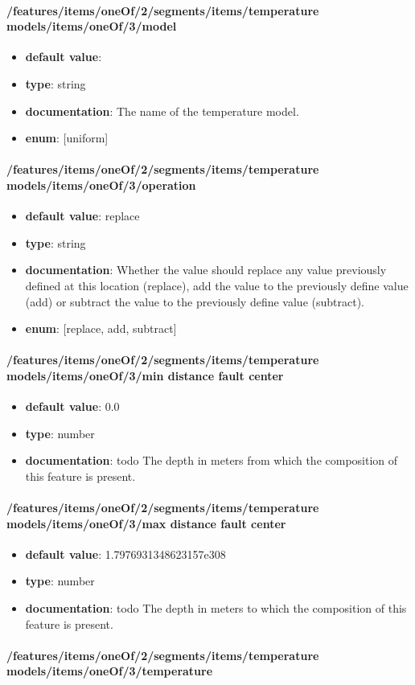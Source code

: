 \paragraph{/features/items/oneOf/2/segments/items/temperature models/items/oneOf/3/model}
\begin{itemize}\item {\bf default value}: 
\item {\bf type}: string
\item {\bf documentation}: The name of the temperature model.
\item {\bf enum}: [uniform]\end{itemize}\paragraph{/features/items/oneOf/2/segments/items/temperature models/items/oneOf/3/operation}
\begin{itemize}\item {\bf default value}: replace
\item {\bf type}: string
\item {\bf documentation}: Whether the value should replace any value previously defined at this location (replace), add the value to the previously define value (add) or subtract the value to the previously define value (subtract).
\item {\bf enum}: [replace, add, subtract]\end{itemize}\paragraph{/features/items/oneOf/2/segments/items/temperature models/items/oneOf/3/min distance fault center}
\begin{itemize}\item {\bf default value}: 0.0
\item {\bf type}: number
\item {\bf documentation}: todo The depth in meters from which the composition of this feature is present.
\end{itemize}\paragraph{/features/items/oneOf/2/segments/items/temperature models/items/oneOf/3/max distance fault center}
\begin{itemize}\item {\bf default value}: 1.7976931348623157e308
\item {\bf type}: number
\item {\bf documentation}: todo The depth in meters to which the composition of this feature is present.
\end{itemize}\paragraph{/features/items/oneOf/2/segments/items/temperature models/items/oneOf/3/temperature}
